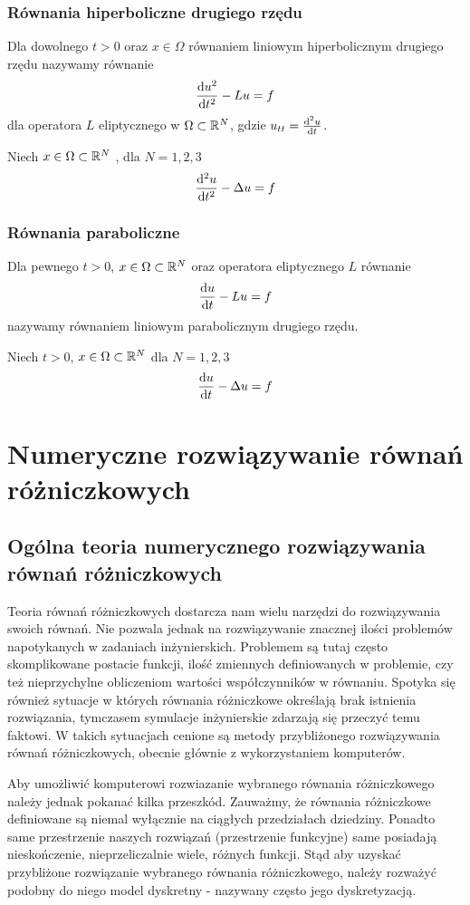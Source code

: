 \documentclass[12pt,a4paper]{report}
\begin{document}
\subsection{Równania hiperboliczne drugiego rzędu} 
Dla dowolnego $t>0$ oraz $ x \in \Omega $ równaniem liniowym hiperbolicznym drugiego rzędu nazywamy równanie 
$$
\ddx[u^2]{t^2} - Lu = f
$$ 
dla operatora $L$ eliptycznego w $\Omega \subset \setR^N$, gdzie $ u_{tt} = \ddx[^2u]{t}$.  
\begin{example}
Niech $x \in \Omega \subset \setR^N $ , dla $ N = 1,2,3$
$$
\ddx[^2u]{t^2} - \Delta u = f 
$$
\end{example}
\subsection{Równania paraboliczne}
Dla pewnego $t>0$, $x \in \Omega \subset \setR^N$ oraz operatora eliptycznego $L$ równanie
$$
\ddx[u]{t} -  Lu = f 
$$
nazywamy równaniem liniowym parabolicznym drugiego rzędu. 
\begin{example} 
Niech $t>0$, $x \in \Omega \subset \setR^N $ dla $ N = 1,2,3 $
$$
\ddx[u]{t} - \Delta u = f
$$
\end{example}

\chapter{Numeryczne rozwiązywanie równań różniczkowych}

\section{Ogólna teoria numerycznego rozwiązywania równań różniczkowych}

Teoria równań różniczkowych dostarcza nam wielu narzędzi do rozwiązywania swoich równań. Nie pozwala jednak na rozwiązywanie znacznej ilości problemów napotykanych w zadaniach inżynierskich. Problemem są tutaj często skomplikowane postacie funkcji, ilość zmiennych definiowanych w problemie, czy też nieprzychylne obliczeniom wartości współczynników w równaniu. Spotyka się również sytuacje w których równania różniczkowe określają brak istnienia rozwiązania, tymczasem symulacje inżynierskie zdarzają się przeczyć temu faktowi. W takich sytuacjach cenione są metody przybliżonego rozwiązywania równań różniczkowych, obecnie głównie z wykorzystaniem komputerów. 

Aby umożliwić komputerowi rozwiazanie wybranego równania różniczkowego należy jednak pokanać kilka przeszkód. Zauważmy, że równania różniczkowe definiowane są niemal wyłącznie na ciągłych przedziałach dziedziny. Ponadto same przestrzenie naszych rozwiązań (przestrzenie funkcyjne) same posiadają nieskończenie, nieprzeliczalnie wiele, różnych funkcji. Stąd aby uzyskać przybliżone rozwiązanie wybranego równania różniczkowego, należy rozważyć podobny do niego model dyskretny - nazywany często jego dyskretyzacją. 
\end{document}
